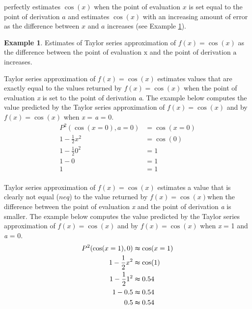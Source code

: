 \documentclass[
12pt, %
twoside,
english]{guelphthesis}
\theoremstyle{definition}
\theoremstyle{definition}
\newtheorem{example}{Example}[chapter]
\theoremstyle{definition}
\theoremstyle{definition}
\theoremstyle{remark}
\begin{document}
perfectly estimates \(\cos(x)\) when the point of evaluation \(x\) is set
equal to the point of derivation \(a\) and estimates \(\cos(x)\) with an
increasing amount of error as the difference between \(x\) and \(a\)
increases (see Example \ref{exm:taylor-estimates}).
\begin{example}
\protect\hypertarget{exm:taylor-estimates}{}\label{exm:taylor-estimates}Estimates of Taylor series approximation of \(f(x) = \cos(x)\) as the difference between the point of evaluation \(\mathrm{x}\) and the point of derivation \(\mathrm{a}\) increases.

\noindent \textup{Taylor series approximation of $f(x) = \cos(x)$ estimates values that are exactly equal to the values returned by $f(x) = \cos(x)$ when the point of evaluation \textit{x} is set to the point of derivation \textit{a}. The example below computes the value predicted by the Taylor series approximation of $f(x) = \cos(x)$ and by $f(x) = \cos(x)$ when \textit{x} = \textit{a} = 0.}
\begin{align*}
P^2(\cos(x=0), a=0) &= \cos(x=0) \nonumber \\ 
1- \frac{1}{2}x^2 &=  \cos(0) \nonumber \\ 
1- \frac{1}{2}0^2 &=  1 \nonumber \\ 
1- 0 &=  1 \nonumber \\ 
1 &=  1 \nonumber \\ 
\end{align*}
\vspace*{-25mm}

\noindent \textup{Taylor series approximation of $f(x) = \cos(x)$ estimates a value that is clearly not equal ($neq$) to the value returned by $f(x) = \cos(x)$when the difference between the point of evaluation \textit{x} and the point of derivation \textit{a} is smaller. The example below computes the value predicted by the Taylor series approximation of $f(x) = \cos(x)$ and by $f(x) = \cos(x)$ when \textit{x} = 1 and  \textit{a} = 0.}
\begin{align*}
P^2(\cos(x = 1), 0) &\thickapprox \cos(x = 1) \nonumber \\ 
1- \frac{1}{2}x^2 &\thickapprox   \cos(1) \nonumber \\ 
1- \frac{1}{2}1^2 &\thickapprox   0.54 \nonumber \\ 
1- 0.5 &\thickapprox   0.54 \nonumber \\ 
0.5 &\thickapprox 0.54 \nonumber \\ 
\end{align*}
\vspace*{-25mm}


\end{example}
\end{document}
